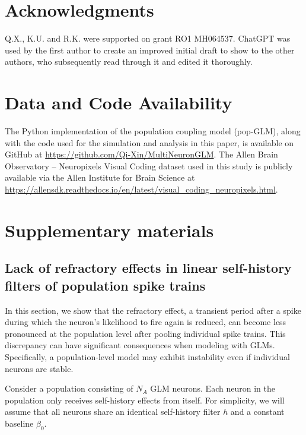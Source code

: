 \documentclass[12pt]{article}
\begin{document}
\section*{Acknowledgments}
Q.X., K.U. and R.K. were supported on grant RO1 MH064537. 
ChatGPT was used by the first author to create an improved initial draft to show to the other authors, who subsequently read through it and edited it thoroughly.

\section*{Data and Code Availability}

The Python implementation of the population coupling model (pop-GLM), along with the code used for the simulation and analysis in this paper, is available on GitHub at \url{https://github.com/Qi-Xin/MultiNeuronGLM}. The Allen Brain Observatory – Neuropixels Visual Coding dataset used in this study is publicly available via the Allen Institute for Brain Science at \url{https://allensdk.readthedocs.io/en/latest/visual_coding_neuropixels.html}.




\newcommand{\beginsupplement}{%
        \setcounter{table}{0}
        \renewcommand{\thetable}{S\arabic{table}}%
        \setcounter{figure}{0}
        \renewcommand{\thefigure}{S\arabic{figure}}%
     }
\beginsupplement

\newpage


\section*{Supplementary materials}


\subsection*{Lack of refractory effects in linear self-history filters of population spike trains}
\label{Sec:lack_of_refractory}

In this section, we show that the refractory effect, a transient period after a spike during which the neuron's likelihood to fire again is reduced, can become less pronounced at the population level after pooling individual spike trains. This discrepancy can have significant consequences when modeling with GLMs. Specifically, a population-level model may exhibit instability even if individual neurons are stable.

Consider a population consisting of $N_A$ GLM neurons. Each neuron in the population only receives self-history effects from itself. For simplicity, we will assume that all neurons share an identical self-history filter $h$ and a constant baseline $\beta_0$. 
\end{document}
